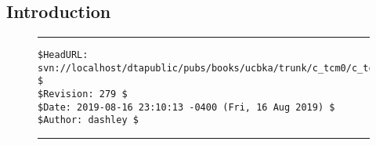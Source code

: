 
\chapter{\ctcmzerolongtitle{}}

\label{ctcm0}


\section{Introduction}



\noindent\begin{figure}[!b]
\noindent\rule[-0.25in]{\textwidth}{1pt}
\begin{tiny}
\begin{verbatim}
$HeadURL: svn://localhost/dtapublic/pubs/books/ucbka/trunk/c_tcm0/c_tcm0.tex $
$Revision: 279 $
$Date: 2019-08-16 23:10:13 -0400 (Fri, 16 Aug 2019) $
$Author: dashley $
\end{verbatim}
\end{tiny}
\noindent\rule[0.25in]{\textwidth}{1pt}
\end{figure}
%
